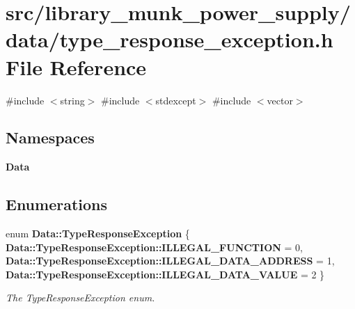 \section{src/library\+\_\+munk\+\_\+power\+\_\+supply/data/type\+\_\+response\+\_\+exception.h File Reference}
\label{type__response__exception_8h}
{\ttfamily \#include $<$string$>$}\newline
{\ttfamily \#include $<$stdexcept$>$}\newline
{\ttfamily \#include $<$vector$>$}\newline
\subsection*{Namespaces}
\begin{DoxyCompactItemize}
\item 
 \textbf{ Data}
\end{DoxyCompactItemize}
\subsection*{Enumerations}
\begin{DoxyCompactItemize}
\item 
enum \textbf{ Data\+::\+Type\+Response\+Exception} \{ \textbf{ Data\+::\+Type\+Response\+Exception\+::\+I\+L\+L\+E\+G\+A\+L\+\_\+\+F\+U\+N\+C\+T\+I\+ON} = 0, 
\textbf{ Data\+::\+Type\+Response\+Exception\+::\+I\+L\+L\+E\+G\+A\+L\+\_\+\+D\+A\+T\+A\+\_\+\+A\+D\+D\+R\+E\+SS} = 1, 
\textbf{ Data\+::\+Type\+Response\+Exception\+::\+I\+L\+L\+E\+G\+A\+L\+\_\+\+D\+A\+T\+A\+\_\+\+V\+A\+L\+UE} = 2
 \}\begin{DoxyCompactList}\small\item\em The Type\+Response\+Exception enum. \end{DoxyCompactList}
\end{DoxyCompactItemize}
